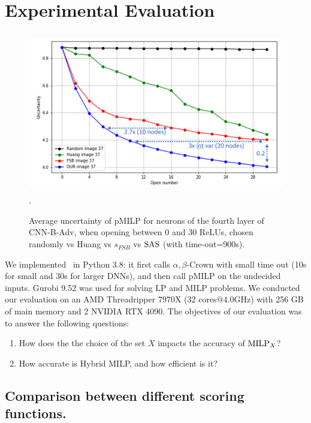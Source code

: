 \section{Experimental Evaluation}

\begin{figure}[b!]
	\centering
	\vspace*{-0.3cm}
	\includegraphics[height=7cm]{open.png}.
	\vspace*{-0.4cm}
	\caption{Average uncertainty of pMILP for neurons of the fourth layer of CNN-B-Adv, 
	when opening between 0 and 30 ReLUs, chosen randomly vs Huang \cite{DivideAndSlide} vs 
	$s_{FSB}$ vs $\mathrm{SAS}$ (with time-out=900s).}
	\label{fig_table3}
\end{figure}

%
We implemented \toolname\ in Python 3.8: it first calls $\alpha,\beta$-Crown with small time out (10s for small and 30s for larger DNNs), and then call pMILP on the undecided inputs.
Gurobi 9.52 was used for solving LP and MILP problems. We conducted our evaluation on an AMD Threadripper 7970X  ($32$ cores$@4.0$GHz) with 256 GB of main memory and 2 NVIDIA RTX 4090. The  objectives of our evaluation was to answer the following  questions:

\begin{enumerate}
	\item How does the the choice of the set $X$ impacts the accuracy of ${\textrm{MILP}}_X$? 
	\item How accurate is Hybrid MILP, and how efficient is it?
\end{enumerate}


\subsection{Comparison between different scoring functions.}

